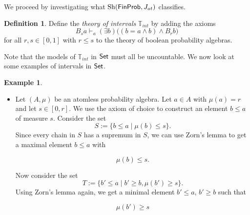 \documentclass[a4paper]{amsproc}
\theoremstyle{plain}
\theoremstyle{definition}
\newtheorem{example}[theorem]{Example}
\newtheorem{definition}[theorem]{Definition}
\theoremstyle{remark}
\numberwithin{equation}{section}
\DeclareMathOperator{\Sh}{Sh}
\newcommand{\Set}{\textup{\textsf{Set}}}
\newcommand{\FinProb}{\textup{\textsf{FinProb}}}
\begin{document}
We proceed by investigating what $\Sh(\FinProb, J_{at})$ classifies.

\begin{definition} \label{theory_of_intevals}
Define the \textit{theory of intervals} $\mathbb{T}_{int}$ by adding the axioms
\[
B_s a \vdash_a (\exists b) \big ( (b = a \wedge b) \wedge B_r b \big )
\]
for all $r,s \in [0,1]$ with $r \leq s$ to the theory of boolean probability algebras.
\end{definition}

Note that the models of $\mathbb{T}_{int}$ in $\Set$ must all be uncountable. We now look at some examples of intervals in $\Set$.

\begin{example} \label{interval_examples}
\mbox{}
\begin{itemize}
\item Let $(A,\mu)$ be an atomless probability algebra. Let $a \in A$ with $\mu(a) = r$ and let $s \in [0,r]$. We use the axiom of choice to construct an element $b
\leq a$ of measure $s$. Consider the set
\[
S := \{ b \leq a \mid \mu(b) \leq s \}.
\]
Since every chain in $S$ has a supremum in $S$, we can use Zorn's lemma to get a maximal element $b \leq a$ with

\[
    \mu(b) \leq s .
\]

Now consider the set
\[
T := \{ b' \leq a \mid b' \geq b, \mu(b') \geq s\} .
\]
Using Zorn's lemma again, we get a minimal element $b' \leq a$, $b' \geq b$ such that

\[
    \mu(b') \geq s
\]


\end{itemize}
\end{example}
\end{document}
